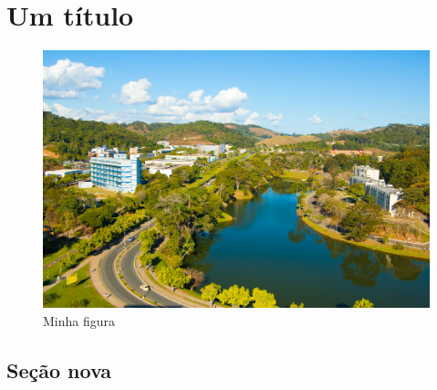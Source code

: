 \documentclass[12pt]{report}
\begin{document}
\clearpage
\chapter{Um título}
\lipsum[2-2] \citep{lamport1986latex} 
\begin{figure}[h]
\centering
\caption{Minha figura}
\includegraphics[scale=0.7]{./capitulos/cap01/ufv.jpg}
\end{figure}
\section{Seção nova}
\lipsum[2-3]



\end{document}
